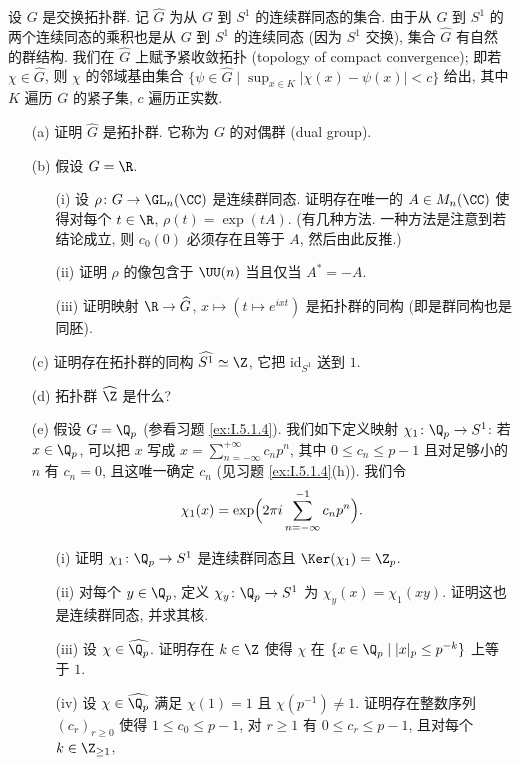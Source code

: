 \begin{exercise}
\label{ex:I.5.4.1}
设 $G$ 是交换拓扑群. 记 $\widehat{G}$ 为从 $G$ 到 $S^1$ 的连续群同态的集合.
由于从 $G$ 到 $S^1$ 的两个连续同态的乘积也是从 $G$ 到 $S^1$ 的连续同态 (因为 $S^1$ 交换), 集合 $\widehat{G}$ 有自然的群结构. 我们在 $\widehat{G}$ 上赋予紧收敛拓扑 (topology of compact convergence); 即若 $\chi \in \widehat{G}$, 则 $\chi$ 的邻域基由集合 $\{\psi \in \widehat{G} \mid \sup_{x \in K}|\chi(x) - \psi(x)| < c\}$ 给出, 其中 $K$ 遍历 $G$ 的紧子集, $c$ 遍历正实数.
\begin{enumerate}
\item[(a)] 证明 $\widehat{G}$ 是拓扑群. 它称为 $G$ 的对偶群 (dual group).
\item[(b)] 假设 $G = \R$.
  \begin{enumerate}
  \item[(i)] 设 $\rho \colon G \to \GL_n(\CC)$ 是连续群同态. 证明存在唯一的 $A \in M_n(\CC)$ 使得对每个 $t \in \R$, $\rho(t) = \exp(tA)$. (有几种方法. 一种方法是注意到若结论成立, 则 $c_0(0)$ 必须存在且等于 $A$, 然后由此反推.)
  \item[(ii)] 证明 $\rho$ 的像包含于 $\UU(n)$ 当且仅当 $A^* = -A$.
  \item[(iii)] 证明映射 $\R \to \widehat{G}$, $x \longmapsto (t \longmapsto e^{ixt})$ 是拓扑群的同构 (即是群同构也是同胚).
  \end{enumerate}
\item[(c)] 证明存在拓扑群的同构 $\widehat{S^1} \simeq \Z$, 它把 $\mathrm{id}_{S^1}$ 送到 $1$.
\item[(d)] 拓扑群 $\widehat{\Z}$ 是什么?
\item[(e)] 假设 $G = \Q_p$ (参看习题 \ref{ex:I.5.1.4}). 我们如下定义映射 $\chi_1 \colon \Q_p \to S^1$: 若 $x \in \Q_p$, 可以把 $x$ 写成 $x = \sum_{n=-\infty}^{+\infty}c_np^n$, 其中 $0 \leq c_n \leq p - 1$ 且对足够小的 $n$ 有 $c_n = 0$, 且这唯一确定 $c_n$ (见习题 \ref{ex:I.5.1.4}(h)). 我们令
  \[
  \chi_1(x) = \exp\Bigl(2\pi i\sum_{n=-\infty}^{-1}c_np^n\Bigr).
  \]
  \begin{enumerate}
  \item[(i)] 证明 $\chi_1 \colon \Q_p \to S^1$ 是连续群同态且 $\Ker(\chi_1) = \Z_p$.
  \item[(ii)] 对每个 $y \in \Q_p$, 定义 $\chi_y \colon \Q_p \to S^1$ 为 $\chi_y(x) = \chi_1(xy)$. 证明这也是连续群同态, 并求其核.
  \item[(iii)] 设 $\chi \in \widehat{\Q_p}$. 证明存在 $k \in \Z$ 使得 $\chi$ 在 $\{x \in \Q_p \mid |x|_p \leq p^{-k}\}$ 上等于 $1$.
  \item[(iv)] 设 $\chi \in \widehat{\Q_p}$ 满足 $\chi(1) = 1$ 且 $\chi(p^{-1}) \neq 1$. 证明存在整数序列 $(c_r)_{r \geq 0}$ 使得 $1 \leq c_0 \leq p - 1$, 对 $r \geq 1$ 有 $0 \leq c_r \leq p - 1$, 且对每个 $k \in \Z_{\geq 1}$,

\end{enumerate}
\end{enumerate}
\end{exercise}
